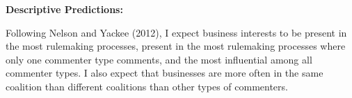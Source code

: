 \textbf{Descriptive Predictions:}

Following Nelson and Yackee (2012), I expect business interests to be present in the most rulemaking processes, present in the most rulemaking processes where only one commenter type comments, and the most influential among all commenter types. I also expect that businesses are more often in the same coalition than different coalitions than other types of commenters.











